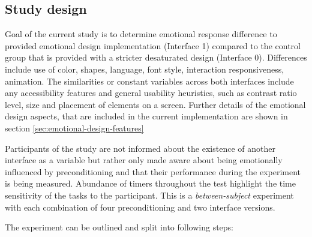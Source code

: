 	\subsection{Study design} \label{sec:study-design}
	
	Goal of the current study is to determine emotional response difference to provided emotional design implementation (Interface 1) compared to the control group that is provided with a stricter desaturated design (Interface 0). Differences include use of color, shapes, language, font style, interaction responsiveness, animation. The similarities or constant variables across both interfaces include any accessibility features and general usability heuristics, such as contrast ratio level, size and placement of elements on a screen. Further details of the emotional design aspects, that are included in the current implementation are shown in section \ref{sec:emotional-design-features}
	
	Participants of the study are not informed about the existence of another interface as a variable but rather only made aware about being emotionally influenced by preconditioning and that their performance during the experiment is being measured. Abundance of timers throughout the test highlight the time sensitivity of the tasks to the participant. This is a \textit{between-subject} experiment with each combination of four preconditioning and two interface versions.
	
	The experiment can be outlined and split into following steps:
	
